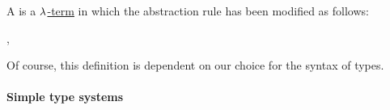 \begin{definition}\label{def:pseudoterm}
  A  is a \hyperref[def:lambda_term]{\( \synlambda \)-term} in which the abstraction rule has been modified as follows:
  \begin{bnf*}
     {\bnftsq{\( ( \)} \bnfsp \bnftsq{\( \synlambda \)} \bnfsp {} \bnfsp \bnftsq{:} \bnfsp {} \bnfsp {} \bnfsp {} \bnfsp \bnftsq{\( ) \)}}, \\
  \end{bnf*}
\end{definition}
\begin{comments}
  \item Of course, this definition is dependent on our choice for the syntax of types.
\end{comments}

\paragraph{Simple type systems}\hfill

\begin{remark}\label{rem:church_and_curry_typing}

\end{remark}

\begin{remark}\label{rem:dependent_types}
\end{remark}

